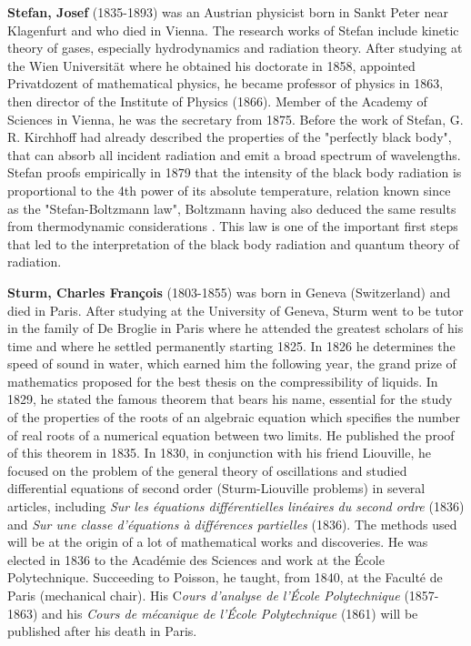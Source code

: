 \textbf{Stefan, Josef} (1835-1893) was an Austrian physicist born in Sankt Peter near Klagenfurt and who died in Vienna. The research works of Stefan include kinetic theory of gases, especially hydrodynamics and radiation theory. After studying at the Wien Universität where he obtained his doctorate in 1858, appointed Privatdozent of mathematical physics, he became professor of physics in 1863, then director of the Institute of Physics (1866). Member of the Academy of Sciences in Vienna, he was the secretary from 1875. Before the work of Stefan, G. R. Kirchhoff had already described the properties of the "perfectly black body", that can absorb all incident radiation and emit a broad spectrum of wavelengths. Stefan proofs empirically in 1879 that the intensity of the black body radiation is proportional to the 4th power of its absolute temperature, relation known since as the "Stefan-Boltzmann law", Boltzmann having also deduced the same results from thermodynamic considerations . This law is one of the important first steps that led to the interpretation of the black body radiation and quantum theory of radiation.

\textbf{Sturm, Charles François} (1803-1855) was born in Geneva (Switzerland) and died in Paris. After studying at the University of Geneva, Sturm went to be tutor in the family of De Broglie in Paris where he attended the greatest scholars of his time and where he settled permanently starting 1825. In 1826 he determines the speed of sound in water, which earned him the following year, the grand prize of mathematics proposed for the best thesis on the compressibility of liquids. In 1829, he stated the famous theorem that bears his name, essential for the study of the properties of the roots of an algebraic equation which specifies the number of real roots of a numerical equation between two limits. He published the proof of this theorem in 1835. In 1830, in conjunction with his friend Liouville, he focused on the problem of the general theory of oscillations and studied differential equations of second order (Sturm-Liouville problems) in several articles, including \textit{Sur les équations différentielles linéaires du second ordre} (1836) and \textit{Sur une classe d'équations à différences partielles} (1836). The methods used will be at the origin of a lot of mathematical works and discoveries. He was elected in 1836 to the Académie des Sciences and work at the École Polytechnique. Succeeding to Poisson, he taught, from 1840, at the Faculté de Paris (mechanical chair). His C\textit{ours d'analyse de l'École Polytechnique} (1857-1863) and his \textit{Cours de mécanique de l'École Polytechnique} (1861) will be published after his death in Paris.

